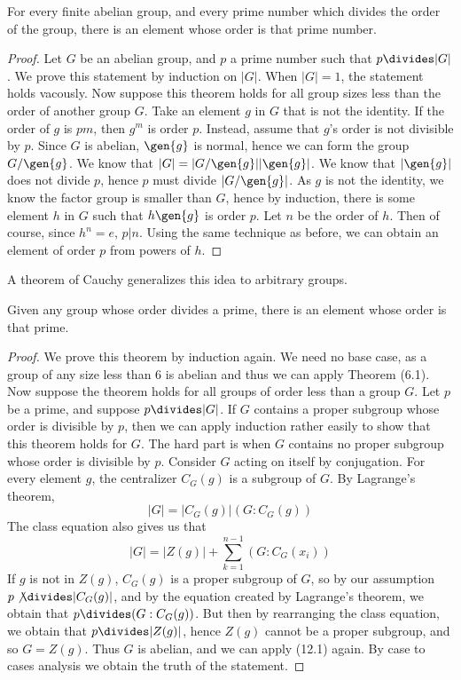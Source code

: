 \begin{theorem}
    For every finite abelian group, and every prime number which divides the order of the group, there is an element whose order is that prime number.
\end{theorem}
\begin{proof}
    Let $G$ be an abelian group, and $p$ a prime number such that $p \divides |G|$. We prove this statement by induction on $|G|$. When $|G| = 1$, the statement holds vacously. Now suppose this theorem holds for all group sizes less than the order of another group $G$. Take an element $g$ in $G$ that is not the identity. If the order of $g$ is $pm$, then $g^m$ is order $p$. Instead, assume that $g$'s order is not divisible by $p$. Since $G$ is abelian, $\gen{g}$ is normal, hence we can form the group $G/\gen{g}$. We know that $|G| = |G/\gen{g}| |\gen{g}|$. We know that $|\gen{g}|$ does not divide $p$, hence $p$ must divide $|G/\gen{g}|$. As $g$ is not the identity, we know the factor group is smaller than $G$, hence by induction, there is some element $h$ in $G$ such that $h \gen{g}$ is order $p$. Let $n$ be the order of $h$. Then of course, since $h^n = e$, $p|n$. Using the same technique as before, we can obtain an element of order $p$ from powers of $h$.
\end{proof}

A theorem of Cauchy generalizes this idea to arbitrary groups.

\begin{theorem} 
    Given any group whose order divides a prime, there is an element whose order is that prime.
\end{theorem}
\begin{proof}
    We prove this theorem by induction again. We need no base case, as a group of any size less than 6 is abelian and thus we can apply Theorem (6.1). Now suppose the theorem holds for all groups of order less than a group $G$. Let $p$ be a prime, and suppose $p \divides |G|$. If $G$ contains a proper subgroup whose order is divisible by $p$, then we can apply induction rather easily to show that this theorem holds for $G$. The hard part is when $G$ contains no proper subgroup whose order is divisible by $p$. Consider $G$ acting on itself by conjugation. For every element $g$, the centralizer $C_G(g)$ is a subgroup of $G$. By Lagrange's theorem,
    \[ |G| = |C_G(g)|(G:C_G(g)) \]
    The class equation also gives us that
    \[ |G| = |Z(g)| + \sum_{k = 1}^{n-1} (G:C_G(x_i)) \]
    If $g$ is not in $Z(g)$, $C_G(g)$ is a proper subgroup of $G$, so by our assumption $p \not \divides |C_G(g)|$, and by the equation created by Lagrange's theorem, we obtain that $p \divides (G:C_G(g))$. But then by rearranging the class equation, we obtain that $p \divides |Z(g)|$, hence $Z(g)$ cannot be a proper subgroup, and so $G = Z(g)$. Thus $G$ is abelian, and we can apply (12.1) again. By case to cases analysis we obtain the truth of the statement.
\end{proof}

